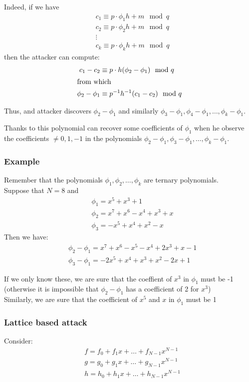 \noindent
Indeed, if we have
\begin{align*}
    &c_1 \equiv p \cdot \phi_1 h + m \mod q\\
    &c_2 \equiv p \cdot \phi_2 h + m \mod q\\
    &\vdots \\
    &c_k \equiv p \cdot \phi_k h + m \mod q
\end{align*}
\noindent
then the attacker can compute:
\begin{align*}
  c_1 - c_2 &\equiv p \cdot h (\phi_2 - \phi_1) \mod q \\
  \intertext{from which}
  \phi_2 - \phi_1 &\equiv p^{-1} h^{-1} (c_1 - c_2) \mod q
\end{align*}

\noindent
Thus, and attacker discovers $\phi_2 - \phi_1$ and similarly $\phi_3 - \phi_1, \phi_4 - \phi_1, \ldots, \phi_k - \phi_1$.\medskip

\noindent
Thanks to this polynomial can recover some coefficients of $\phi_1$ when he observe the coefficients $\neq 0,1,-1$ in the polynomials $\phi_2 - \phi_1, \phi_3 - \phi_1, \ldots, \phi_k - \phi_1$.

\subsubsection*{Example}
Remember that the polynomials $\phi_1, \phi_2, \ldots, \phi_k$ are ternary polynomials.\\
Suppose that $N = 8$ and
\begin{align*}
    &\phi_1 = x^5 + x^3 + 1\\
    &\phi_2 = x^7 + x^6 - x^4 + x^3 + x\\
    &\phi_3 = -x^5 + x^4 + x^2 -x
\end{align*}
\noindent
Then we have:
\begin{align*}
    &\phi_2 - \phi_1 = x^7 + x^6 - x^5 - x^4 + 2x^3 + x - 1\\
    &\phi_3 - \phi_1 = -2x^5 + x^4 + x^3 + x^2 - 2x + 1
\end{align*}

\noindent
If we only know these, we are sure that the coeffient of $x^3$ in $\phi_1$ must be -1 (otherwise it is impossible that $\phi_2 - \phi_1$ has a coefficient of 2 for $x^3$)\\
Similarly, we are sure that the coefficient of $x^5$ and $x$ in $\phi_1$ must be 1
\vspace{0.5 cm}

\subsubsection*{Lattice based attack}
Consider:
\begin{align*}
    &f = f_0 + f_1 x + \ldots + f_{N-1} x^{N-1} \\
    &g = g_0 + g_1 x + \ldots + g_{N-1} x^{N-1} \\
    &h = h_0 + h_1 x + \ldots + h_{N-1} x^{N-1}
\end{align*}

